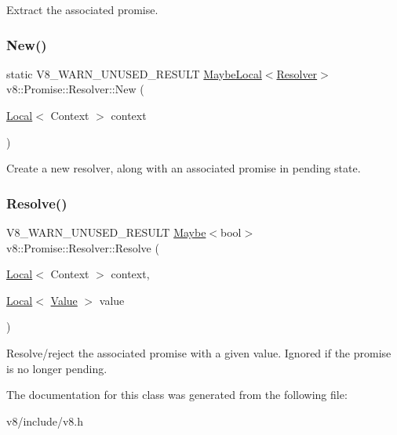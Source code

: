Extract the associated promise. \mbox{\label{classv8_1_1Promise_1_1Resolver_af2290c10e43fcde230ea7a79b9128b0e}} 
\subsubsection{\texorpdfstring{New()}{New()}}
{\footnotesize\ttfamily static V8\+\_\+\+W\+A\+R\+N\+\_\+\+U\+N\+U\+S\+E\+D\+\_\+\+R\+E\+S\+U\+LT \mbox{\hyperlink{classv8_1_1MaybeLocal}{Maybe\+Local}}$<$\mbox{\hyperlink{classv8_1_1Promise_1_1Resolver}{Resolver}}$>$ v8\+::\+Promise\+::\+Resolver\+::\+New (\begin{DoxyParamCaption}\item[{\mbox{\hyperlink{classv8_1_1Local}{Local}}$<$ Context $>$}]{context }\end{DoxyParamCaption})\hspace{0.3cm}{\ttfamily [static]}}

Create a new resolver, along with an associated promise in pending state. \mbox{\label{classv8_1_1Promise_1_1Resolver_a7e5ba9aab1a36574fdfad04da9a543a5}} 
\subsubsection{\texorpdfstring{Resolve()}{Resolve()}}
{\footnotesize\ttfamily V8\+\_\+\+W\+A\+R\+N\+\_\+\+U\+N\+U\+S\+E\+D\+\_\+\+R\+E\+S\+U\+LT \mbox{\hyperlink{classv8_1_1Maybe}{Maybe}}$<$bool$>$ v8\+::\+Promise\+::\+Resolver\+::\+Resolve (\begin{DoxyParamCaption}\item[{\mbox{\hyperlink{classv8_1_1Local}{Local}}$<$ Context $>$}]{context,  }\item[{\mbox{\hyperlink{classv8_1_1Local}{Local}}$<$ \mbox{\hyperlink{classv8_1_1Value}{Value}} $>$}]{value }\end{DoxyParamCaption})}

Resolve/reject the associated promise with a given value. Ignored if the promise is no longer pending. 

The documentation for this class was generated from the following file\+:\begin{DoxyCompactItemize}
\item 
v8/include/v8.\+h\end{DoxyCompactItemize}
